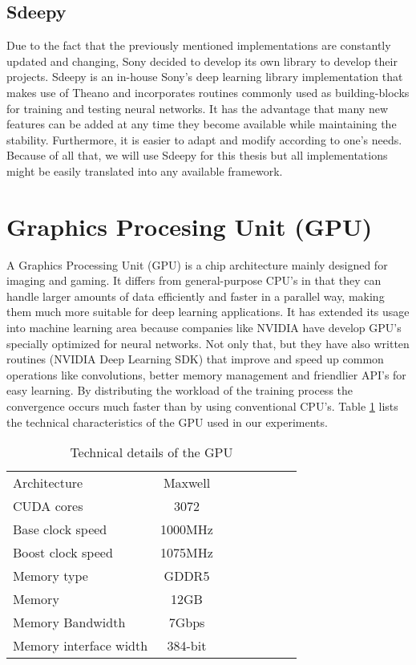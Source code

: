 \FloatBarrier
     
\subsection{Sdeepy}
Due to the fact that the previously mentioned implementations are constantly updated and changing, Sony decided to develop its own library to develop their projects. Sdeepy is an in-house Sony's deep learning library implementation that makes use of Theano and incorporates routines commonly used as building-blocks for training and testing neural networks. It has the advantage that many new features can be added at any time they become available while maintaining the stability. Furthermore, it is easier to adapt and modify according to one's needs. Because of all that, we will use Sdeepy for this thesis but all implementations might be easily translated into any available framework.

\FloatBarrier

\section{Graphics Procesing Unit (GPU)}
A Graphics Processing Unit (GPU) is a chip architecture mainly designed for imaging and gaming. It differs from general-purpose CPU's in that they can handle larger amounts of data efficiently and faster in a parallel way, making them much more suitable for deep learning applications. It has extended its usage into machine learning area because companies like NVIDIA have develop GPU's specially optimized for neural networks. Not only that, but they have also written routines (NVIDIA Deep Learning SDK) that improve and speed up common operations like convolutions, better memory management and friendlier API's for easy learning. By distributing the workload of the training process the convergence occurs much faster than by using conventional CPU's. Table \ref{tab:GPU1} lists the technical characteristics of the GPU used in our experiments.

\begin{table}[!htb]
\caption[Technical speficications of GeForce GTX Titan]{Technical details of the GPU}
\label{tab:GPU1}
\centering
\begin{tabular}{l*{6}{c}r}
\hline
Architecture   & Maxwell\\
CUDA cores   & 3072\\
Base clock speed   & 1000MHz\\
Boost clock speed   & 1075MHz\\
Memory type   & GDDR5\\
Memory    & 12GB\\
Memory Bandwidth    & 7Gbps\\
Memory interface width    & 384-bit\\
\bottomrule 
\end{tabular}  
\end{table}

